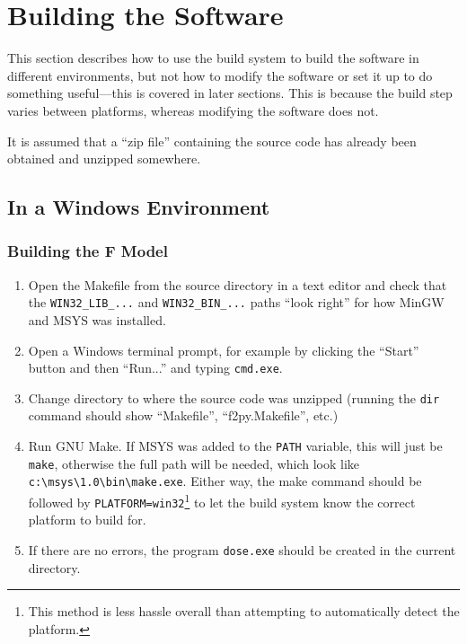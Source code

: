 \section{Building the Software}
\label{dev:build}

This section describes how to use the build system to build the software in different environments, 
but not how to modify the software or set it up to do something useful---this is covered in later 
sections.  This is because the build step varies between platforms, whereas modifying the software 
does not.

It is assumed that a ``zip file'' containing the source code has already been obtained and unzipped 
somewhere.

\subsection{In a Windows Environment}

\subsubsection{Building the F Model}

\begin{enumerate}

\item Open the Makefile from the source directory in a text editor and check that the 
\verb|WIN32_LIB_...| and \verb|WIN32_BIN_...| paths ``look right'' for how MinGW and MSYS was 
installed.

\item Open a Windows terminal prompt, for example by clicking the ``Start'' button and then 
``Run...'' and typing \verb|cmd.exe|.

\item Change directory to where the source code was unzipped (running the \verb|dir| command should 
show ``Makefile'', ``f2py.Makefile'', etc.)

\item Run GNU Make.  If MSYS was added to the \verb|PATH| variable, this will just be \verb|make|, 
otherwise the full path will be needed, which look like \verb|c:\msys\1.0\bin\make.exe|.  Either 
way, the make command should be followed by \verb|PLATFORM=win32|\footnote{This method is less 
hassle overall than attempting to automatically detect the platform.} to let the build system know 
the correct platform to build for.

\item If there are no errors, the program \verb|dose.exe| should be created in the current 
directory.

\end{enumerate}


